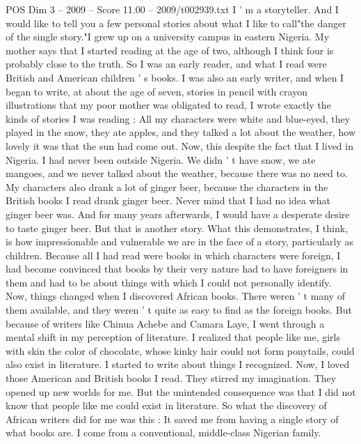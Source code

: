 \begin{textsample}{POS Dim 3 – 2009 – Score 11.00 – 2009/t002939.txt}  \label{ex:f3_pos_055}
I ' m a storyteller.
And I would like to tell you a few personal stories about what I like to call"the danger of the single story."I grew up on a university campus in eastern Nigeria.
My mother says that I started reading at the age of two, although I think four is probably close to the truth.
So I was an early reader, and what I read were British and American children ' s books.
I was also an early writer, and when I began to write, at about the age of seven, stories in pencil with crayon illustrations that my poor mother was obligated to read, I wrote exactly the kinds of stories I was reading : All my characters were white and blue-eyed, they played in the snow, they ate apples, and they talked a lot about the weather, how lovely it was that the sun had come out.
Now, this despite the fact that I lived in Nigeria.
I had never been outside Nigeria.
We didn ' t have snow, we ate mangoes, and we never talked about the weather, because there was no need to.
My characters also drank a lot of ginger beer, because the characters in the British books I read drank ginger beer.
Never mind that I had no idea what ginger beer was.
And for many years afterwards, I would have a desperate desire to taste ginger beer.
But that is another story.
What this demonstrates, I think, is how impressionable and vulnerable we are in the face of a story, particularly as children.
Because all I had read were books in which characters were foreign, I had become convinced that books by their very nature had to have foreigners in them and had to be about things with which I could not personally identify.
Now, things changed when I discovered African books.
There weren ' t many of them available, and they weren ' t quite as easy to find as the foreign books.
But because of writers like Chinua Achebe and Camara Laye, I went through a mental shift in my perception of literature.
I realized that people like me, girls with skin the color of chocolate, whose kinky hair could not form ponytails, could also exist in literature.
I started to write about things I recognized.
Now, I loved those American and British books I read.
They stirred my imagination.
They opened up new worlds for me.
But the unintended consequence was that I did not know that people like me could exist in literature.
So what the discovery of African writers did for me was this : It saved me from having a single story of what books are.
I come from a conventional, middle-class Nigerian family.

\end{textsample}
